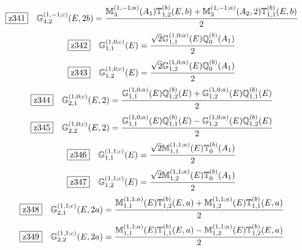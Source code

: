 \documentclass[fleqn,10pt,landscape]{jsarticle}
\begin{document}
\begin{dmath*}
\hspace*{3mm}\fbox{z341}\quad \mathbb{G}_{4,2}^{(1,-1;c)}(E,2b)=\frac{\mathbb{M}_{3}^{(1,-1;a)}(A_{1}) \mathbb{T}_{1,2}^{(b)}(E,b) + \mathbb{M}_{3}^{(1,-1;a)}(A_{2},2) \mathbb{T}_{1,1}^{(b)}(E,b)}{2}
\end{dmath*}
\begin{dmath*}
\hspace*{3mm}\fbox{z342}\quad \mathbb{G}_{1,1}^{(1,0;c)}(E)=\frac{\sqrt{2} \mathbb{G}_{1,1}^{(1,0;a)}(E) \mathbb{Q}_{0}^{(b)}(A_{1})}{2}
\end{dmath*}
\begin{dmath*}
\hspace*{3mm}\fbox{z343}\quad \mathbb{G}_{1,2}^{(1,0;c)}(E)=\frac{\sqrt{2} \mathbb{G}_{1,2}^{(1,0;a)}(E) \mathbb{Q}_{0}^{(b)}(A_{1})}{2}
\end{dmath*}
\begin{dmath*}
\hspace*{3mm}\fbox{z344}\quad \mathbb{G}_{2,1}^{(1,0;c)}(E,2)=\frac{\mathbb{G}_{1,1}^{(1,0;a)}(E) \mathbb{Q}_{1,2}^{(b)}(E) + \mathbb{G}_{1,2}^{(1,0;a)}(E) \mathbb{Q}_{1,1}^{(b)}(E)}{2}
\end{dmath*}
\begin{dmath*}
\hspace*{3mm}\fbox{z345}\quad \mathbb{G}_{2,2}^{(1,0;c)}(E,2)=\frac{\mathbb{G}_{1,1}^{(1,0;a)}(E) \mathbb{Q}_{1,1}^{(b)}(E) - \mathbb{G}_{1,2}^{(1,0;a)}(E) \mathbb{Q}_{1,2}^{(b)}(E)}{2}
\end{dmath*}
\begin{dmath*}
\hspace*{3mm}\fbox{z346}\quad \mathbb{G}_{1,1}^{(1,1;c)}(E)=\frac{\sqrt{2} \mathbb{M}_{1,1}^{(1,1;a)}(E) \mathbb{T}_{0}^{(b)}(A_{1})}{2}
\end{dmath*}
\begin{dmath*}
\hspace*{3mm}\fbox{z347}\quad \mathbb{G}_{1,2}^{(1,1;c)}(E)=\frac{\sqrt{2} \mathbb{M}_{1,2}^{(1,1;a)}(E) \mathbb{T}_{0}^{(b)}(A_{1})}{2}
\end{dmath*}
\begin{dmath*}
\hspace*{3mm}\fbox{z348}\quad \mathbb{G}_{2,1}^{(1,1;c)}(E,2a)=\frac{\mathbb{M}_{1,1}^{(1,1;a)}(E) \mathbb{T}_{1,2}^{(b)}(E,a) + \mathbb{M}_{1,2}^{(1,1;a)}(E) \mathbb{T}_{1,1}^{(b)}(E,a)}{2}
\end{dmath*}
\begin{dmath*}
\hspace*{3mm}\fbox{z349}\quad \mathbb{G}_{2,2}^{(1,1;c)}(E,2a)=\frac{\mathbb{M}_{1,1}^{(1,1;a)}(E) \mathbb{T}_{1,1}^{(b)}(E,a) - \mathbb{M}_{1,2}^{(1,1;a)}(E) \mathbb{T}_{1,2}^{(b)}(E,a)}{2}
\end{dmath*}
\end{document}
